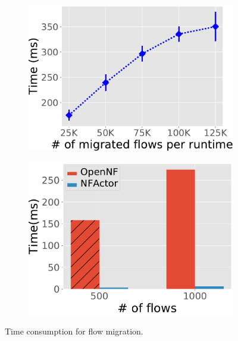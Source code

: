  \begin{figure}[!t]
	\begin{subfigure}[t]{0.49\linewidth}
		\centering
		\includegraphics[width=1.05\columnwidth]{figure/Migration.pdf}
		\caption{}\label{fig:tot-mig} \end{subfigure}\hfill
	 \begin{subfigure}[t]{0.49\linewidth}
		\centering
		\includegraphics[width=\columnwidth]{figure/Compare.pdf}
		\caption{}\label{fig:compare-opennf}
	 \end{subfigure}
\caption{ Time consumption for flow migration.} %
\label{fig:mig-perf}
\end{figure}


